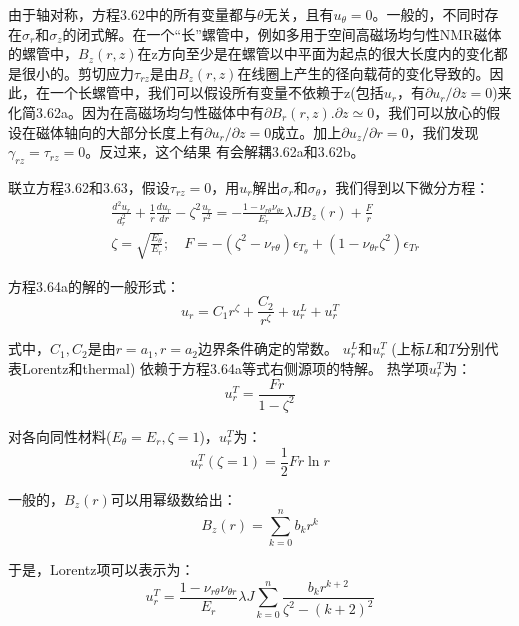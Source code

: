 由于轴对称，方程3.62中的所有变量都与$\theta$无关，且有$u_\theta=0$。一般的，不同时存在$\sigma_r$和$\sigma_z$的闭式解。在一个“长”螺管中，例如多用于空间高磁场均匀性NMR磁体的螺管中，$B_z(r, z)$在z方向至少是在螺管以中平面为起点的很大长度内的变化都是很小的。剪切应力$\tau_{rz}$是由$B_z(r,z)$在线圈上产生的径向载荷的变化导致的。因此，在一个长螺管中，我们可以假设所有变量不依赖于z(包括$u_r$，有$\partial u_r/\partial z=0$)来化简3.62a。因为在高磁场均匀性磁体中有$\partial B_r(r,z).\partial z\simeq 0$，我们可以放心的假设在磁体轴向的大部分长度上有$\partial u_r/\partial z=0$成立。加上$\partial u_z/\partial r=0$，我们发现$\gamma_{rz}=\tau_{rz}=0$。反过来，这个结果 有会解耦3.62a和3.62b。

联立方程3.62和3.63，假设$\tau_{rz}=0$，用$u_r$解出$\sigma_r$和$\sigma_{\theta}$，我们得到以下微分方程：
\begin{subequations}
	\begin{align}
&\frac{d^2u_r}{d_r^2}+\frac{1}{r}\frac{du_r}{dr}-\zeta^2\frac{u_r}{r^2}=-\frac{1-\nu_{r\theta}\nu_{\theta r}}{E_r}\lambda JB_z(r)+\frac{F}{r}\\
&\zeta=\sqrt{\frac{E_\theta}{E_r}};\quad F=
-(\zeta^2-\nu_{r \theta})\epsilon_{T_\theta}+(1-\nu_{\theta r}\zeta^2)\epsilon_{Tr}
	\end{align}
\end{subequations}

方程3.64a的解的一般形式：
\begin{equation}
u_r=C_1r^\zeta+\frac{C_2}{r^\zeta}+u_r^L+u_r^T
\end{equation}

式中，$C_1,C_2$是由$r = a_1, r = a_2$边界条件确定的常数。
$u^L_r$和$u^T_r$ (上标$L$和$T$分别代表Lorentz和thermal) 依赖于方程3.64a等式右侧源项的特解。
热学项$u^T_r$为：
\begin{equation}
u_r^T=\frac{Fr}{1-\zeta^2}
\end{equation}

对各向同性材料($E_\theta =E_r,\zeta =1$)，$u_r^T$为：
\begin{equation}
u_r^T(\zeta=1)=\frac{1}{2}Fr \ln r
\end{equation}

一般的，$B_z(r)$可以用幂级数给出：
\begin{equation}
B_z(r)=\sum_{k=0}^{n}b_kr^k
\end{equation}

于是，Lorentz项可以表示为：
\begin{equation}
u_r^T=\frac{1-\nu_{r\theta}\nu_{\theta r}}{E_r}\lambda J\sum_{k=0}^{n}\frac{b_k r^{k+2}}{\zeta^2-(k+2)^2}
\end{equation}

